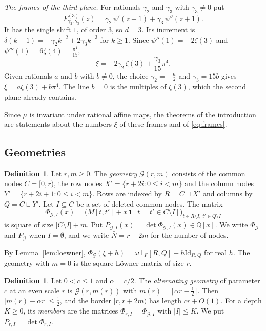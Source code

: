 \documentclass[11pt]{amsart}
\theoremstyle{definition}
\newtheorem{definition}[theorem]{Definition}
\theoremstyle{remark}
\numberwithin{equation}{section}
\newcommand{\Q}{\mathbb Q}
\newcommand{\Lw}{\mathsf L}          %
\newcommand{\Id}{\mathrm{Id}}
\begin{document}
\emph{The frames of the third plane.} For rationals $\gamma_2$ and $\gamma_3$ with $\gamma_3\ne0$ put
\[
 F^{(3)}_{\gamma_2,\gamma_3}(z)=\gamma_2\,\psi'(z+1)+\gamma_3\,\psi''(z+1).
\]
It has the single shift $1$, of order $3$, so $d=3$. Its increment is
$\delta(k-1)=-\gamma_2k^{-2}+2\gamma_3k^{-3}$ for $k\ge1$. Since $\psi''(1)=-2\zeta(3)$ and
$\psi'''(1)=6\zeta(4)=\frac{\pi^4}{15}$,
\[
 \xi=-2\gamma_2\,\zeta(3)+\frac{\gamma_3}{15}\pi^4 .
\]
Given rationals $a$ and $b$ with $b\ne0$, the choice $\gamma_2=-\frac a2$ and $\gamma_3=15b$ gives
$\xi=a\zeta(3)+b\pi^4$. The line $b=0$ is the multiples of $\zeta(3)$, which the second plane already contains.

Since $\mu$ is invariant under rational affine maps, the theorems of the introduction are statements about the
numbers $\xi$ of these frames and of \eqref{eq:frames}.

\subsection{Geometries}
\begin{definition}\label{def:geometry}
Let $r,m\ge0$. The \emph{geometry} $\mathcal G(r,m)$ consists of the common nodes $C=[0,r)$, the row nodes
$X'=\{r+2i:0\le i<m\}$ and the column nodes $Y'=\{r+2i+1:0\le i<m\}$. Rows are indexed by $R=C\sqcup X'$ and columns by
$Q=C\sqcup Y'$. Let $I\subseteq C$ be a set of deleted common nodes. The matrix
\[
 \Phi_{\mathcal G,I}(x)=\bigl(M[t,t']+x\,\mathbf 1[t=t'\in C\setminus I]\bigr)_{t\in R\setminus I,\ t'\in Q\setminus I}
\]
is square of size $|C\setminus I|+m$. Put $P_{\mathcal G,I}(x)=\det\Phi_{\mathcal G,I}(x)\in\Q[x]$. We write
$\Phi_{\mathcal G}$ and $P_{\mathcal G}$ when $I=\emptyset$, and we write $\bar N=r+2m$ for the number of nodes.
\end{definition}

By Lemma~\ref{lem:loewner}, $\Phi_{\mathcal G}(\xi+h)=\omega\,\Lw_F[R,Q]+h\Id_{R,Q}$ for real $h$. The geometry with
$m=0$ is the square L\"owner matrix of size $r$.

\begin{definition}\label{def:altgeom}
Let $0<c\le1$ and $\alpha=c/2$. The \emph{alternating geometry} of parameter $c$ at an even scale $r$ is
$\mathcal G(r,m(r))$ with $m(r)=\lceil\alpha r-\frac12\rceil$. Then $|m(r)-\alpha r|\le\frac12$, and the border
$[r,r+2m)$ has length $cr+O(1)$. For a depth $K\ge0$, its \emph{members} are the matrices
$\Phi_{r,I}=\Phi_{\mathcal G,I}$ with $|I|\le K$. We put $P_{r,I}=\det\Phi_{r,I}$.
\end{definition}
\end{document}
